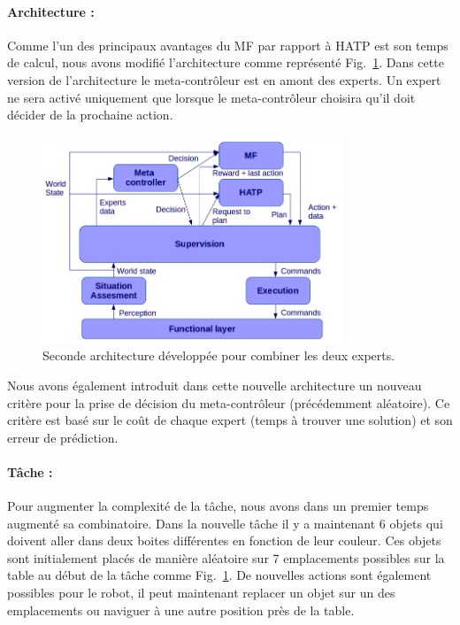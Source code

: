 \documentclass[english,a4paper,11pt,twoside]{StyleThese}
\begin{document}
\paragraph{Architecture :}

Comme l'un des principaux avantages du MF par rapport à HATP est son temps de calcul, nous avons modifié l'architecture comme représenté Fig.~\ref{fig:SecondArchi}. Dans cette version de l'architecture le meta-contrôleur est en amont des experts. Un expert ne sera activé uniquement que lorsque le meta-contrôleur choisira qu'il doit décider de la prochaine action. 

\begin{figure}[!h]
	\centering
    \includegraphics[width=0.8\textwidth]{figs/Chapter7/SecondArchi.png}
    \caption{Seconde architecture développée pour combiner les deux experts.}
    \label{fig:SecondArchi}
\end{figure}

Nous avons également introduit dans cette nouvelle architecture un nouveau critère pour la prise de décision du meta-contrôleur (précédemment aléatoire). Ce critère est basé sur le coût de chaque expert (temps à trouver une solution) et son erreur de prédiction. 

\paragraph{Tâche :}

Pour augmenter la complexité de la tâche, nous avons dans un premier temps augmenté sa combinatoire. Dans la nouvelle tâche il y a maintenant 6 objets qui doivent aller dans deux boites différentes en fonction de leur couleur. Ces objets sont initialement placés de manière aléatoire sur 7 emplacements possibles sur la table au début de la tâche comme Fig.~\ref{fig:SecondArchi}. De nouvelles actions sont également possibles pour le robot, il peut maintenant replacer un objet sur un des emplacements ou naviguer à une autre position près de la table.
\end{document}
